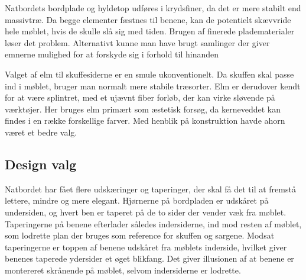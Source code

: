 Natbordets bordplade og hyldetop udføres i krydsfiner, da det er mere stabilt
end massivtræ. Da begge elementer fæstnes til benene, kan de potentielt
skævvride hele møblet, hvis de skulle slå sig med tiden. Brugen af finerede
pladematerialer løser det problem. Alternativt kunne man have brugt samlinger
der giver emnerne mulighed for at forskyde sig i forhold til hinanden

Valget af elm til skuffesiderne er en smule ukonventionelt. Da skuffen skal
passe ind i møblet, bruger man normalt mere stabile træsorter.
Elm er derudover kendt for at være splintret, med et ujævnt fiber forløb, der kan
virke sløvende på værktøjer. Her bruges elm primært som æstetisk forsøg, da
kerneveddet kan findes i en række forskellige farver. Med henblik på
konstruktion havde ahorn været et bedre valg.

\subsection*{Design valg}
Natbordet har fået flere udskæringer og taperinger, der skal få det til at
fremstå lettere, mindre og mere elegant. Hjørnerne på bordpladen er udskåret på
undersiden, og hvert ben er taperet på de to sider der vender væk fra møblet.
Taperingerne på benene efterlader således indersiderne, ind mod resten af
møblet, som lodrette plan der bruges som reference for skuffen og sargene.
Modsat taperingerne er toppen af benene udskåret fra møblets inderside, hvilket
giver benenes taperede ydersider et øget blikfang. Det giver illusionen af at
benene er montereret skrånende på møblet, selvom indersiderne
er lodrette.
